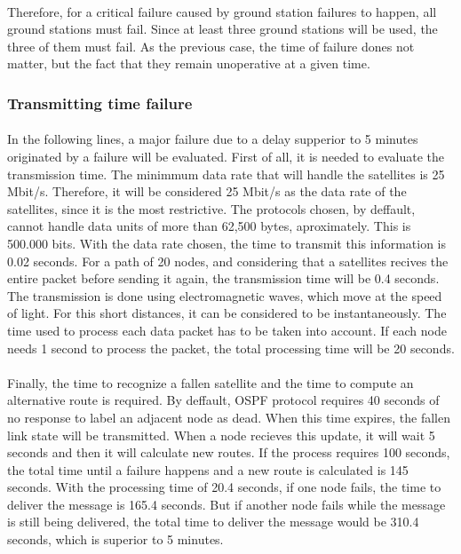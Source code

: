 \paragraph{}Therefore, for a critical failure caused by ground station failures to happen, all ground stations must fail. Since at least three ground stations will be used, the three of them must fail. As the previous case, the time of failure dones not matter, but the fact that they remain unoperative at a given time.

\subsubsection{Transmitting time failure}

\paragraph{}In the following lines, a major failure due to a delay supperior to 5 minutes originated by a failure will be evaluated. First of all, it is needed to evaluate the transmission time. The minimmum data rate that will handle the satellites is 25 Mbit/s. Therefore, it will be considered 25 Mbit/s as the data rate of the satellites, since it is the most restrictive. The protocols chosen, by deffault, cannot handle data units of more than 62,500 bytes, aproximately. This is 500.000 bits. With the data rate chosen, the time to transmit this information is 0.02 seconds. For a path of 20 nodes, and considering that a satellites recives the entire packet before sending it again, the transmission time will be 0.4 seconds. The transmission is done using electromagnetic waves, which move at the speed of light. For this short distances, it can be considered to be instantaneously. The time used to process each data packet has to be taken into account. If each node needs 1 second to process the packet, the total processing time will be 20 seconds. 

\paragraph{}Finally, the time to recognize a fallen satellite and the time to compute an alternative route is required. By deffault, OSPF protocol requires 40 seconds of no response to label an adjacent node as dead. When this time expires, the fallen link state will be transmitted. When a node recieves this update, it will wait 5 seconds and then it will calculate new routes. If the process requires 100 seconds, the total time until a failure happens and a new route is calculated is 145 seconds. With the processing time of 20.4 seconds, if one node fails, the time to deliver the message is 165.4 seconds. But if another node fails while the message is still being delivered, the total time to deliver the message would be 310.4 seconds, which is superior to 5 minutes.


